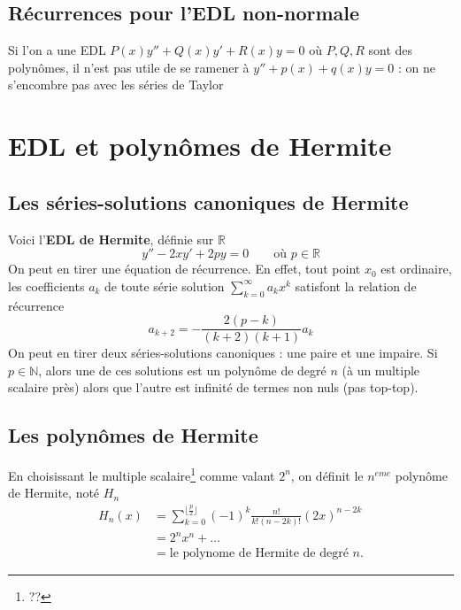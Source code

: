 	\setcounter{subsection}{4}
	\subsection{Récurrences pour l'EDL non-normale}
	Si l'on a une EDL $P(x)y''+Q(x)y'+R(x)y=0$ où $P, Q, R$ sont des polynômes, il 
	n'est pas utile de se ramener à $y''+p(x)+q(x)y=0$ : on ne s'encombre pas avec 
	les séries de Taylor
	
	
\setcounter{section}{4}
\section{EDL et polynômes de Hermite}
	\subsection{Les séries-solutions canoniques de Hermite}
	Voici l'\textbf{EDL de Hermite}, définie sur $\mathbb{R}$
	\begin{equation}
	y''-2xy'+2py=0\qquad\text{où }p\in\mathbb{R}
	\end{equation}
	On peut en tirer une équation de récurrence. En effet, tout point $x_0$ est 
	ordinaire, les coefficients $a_k$ de toute série solution $\sum_{k=0}^\infty 
	a_kx^k$ satisfont la relation de récurrence
	\begin{equation}
	a_{k+2} = -\frac{2(p-k)}{(k+2)(k+1)}a_k
	\end{equation}
	On peut en tirer deux séries-solutions canoniques : une paire et une impaire.
	Si $p\in\mathbb{N}$, alors une de ces solutions est un polynôme de degré 
	$n$ (à un multiple scalaire près) alors que l'autre est infinité de termes 
	non nuls (pas top-top).
	
	\subsection{Les polynômes de Hermite}
	En choisissant le multiple scalaire\footnote{??} comme valant $2^n$, on 
	définit le $n^{eme}$ polynôme de Hermite, noté $H_n$
	\begin{equation}
	\begin{array}{ll}
	H_n(x) &= \sum_{k=0}^{\lfloor\frac{p}{2}\rfloor} (-1)^k\frac{n!}{k!(n-2k)!}
	(2x)^{n-2k}\\
	&= 2^nx^n + \dots\\
	&= \text{le polynome de Hermite de degré $n$.}
	\end{array}
	\end{equation}
	
